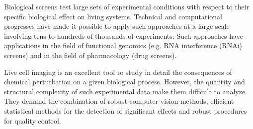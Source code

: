 \documentclass[12pt]{article}
\begin{document}
%
%  
%
Biological screens test large sets of experimental conditions with respect to their specific biological effect on living systems. Technical and computational progresses have made it possible to apply such approaches at a large scale involving tens to hundreds of thousands of experiments. Such approaches have applications in the field of functional genomics (e.g. RNA interference (RNAi) screens) and in the field of pharmacology (drug screens). 

Live cell imaging is an excellent tool to study in detail the consequences of chemical perturbation on a given biological process. However, the quantity and structural complexity of such experimental data make them difficult to analyze. They demand the combination of robust computer vision methods, efficient statistical methods for the detection of significant effects and robust procedures for quality control.
  
\end{document}
